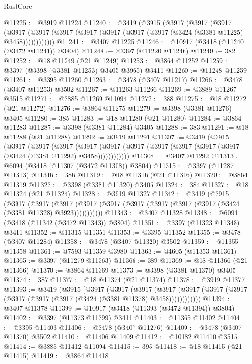\begin{lexlean}{RustCore}
\begin{coremodule}
@11225 := @3919 @11224
@11240 := @3419
    (@3915
      (@3917
        (@3917
          (@3917
            (@3917 (@3917 (@3917 (@3917 (@3917 (@3917 (@3917 (@3424 (@3381 @11225) @3458))))))))))))
@11241 := @3407 @11225
@11246 := @10917 (@3418 (@11240 (@3472 @11241)) @3804)
@11248 := @3397 (@11220 @11246)
@11249 := 382
@11252 := @18 @11249 (@21 @11249)
@11253 := @3864 @11252
@11259 := @3397 (@3398 (@3381 @11253) @3405 @3965) @3411
@11260 := @11248 @11259
@11261 := @3395 @11260
@11263 := @3478 (@3407 @11217)
@11266 := @3478 (@3407 @11253) @3502
@11267 := @11263 @11266
@11269 := @3889 @11267 @3515
@11271 := @3885 @11269 @11094
@11272 := 388
@11275 := @18 @11272 (@21 @11272)
@11276 := @3864 @11275
@11279 := @3398 (@3381 @11276) @3405
@11280 := 385
@11283 := @18 @11280 (@21 @11280)
@11284 := @3864 @11283
@11287 := @3398 (@3381 @11284) @3405
@11288 := 383
@11291 := @18 @11288 (@21 @11288)
@11292 := @3919 @11291
@11307 := @3419
    (@3915
      (@3917
        (@3917
          (@3917
            (@3917 (@3917 (@3917 (@3917 (@3917 (@3917 (@3917 (@3424 (@3381 @11292) @3458))))))))))))
@11308 := @3407 @11292
@11313 := @6094 (@3418 (@11307 (@3472 @11308)) @3804)
@11315 := @3397 (@11287 @11313)
@11316 := 386
@11319 := @18 @11316 (@21 @11316)
@11320 := @3864 @11319
@11323 := @3398 (@3381 @11320) @3405
@11324 := 384
@11327 := @18 @11324 (@21 @11324)
@11328 := @3919 @11327
@11342 := @3419
    (@3915
      (@3917
        (@3917
          (@3917 (@3917 (@3917 (@3917 (@3917 (@3917 (@3917 (@3424 (@3381 @11328) @3923)))))))))))
@11343 := @3407 @11328
@11348 := @6094 (@3418 (@11342 (@3472 @11343)) @3804)
@11351 := @3397 (@11323 @11348) @3411
@11352 := @11315 @11351
@11353 := @3395 @11352
@11355 := @3478 (@3407 @11284)
@11358 := @3478 (@3407 @11320) @3502
@11359 := @11355 @11358
@11361 := @7593 @11359 @3980
@11363 := @4605 (@11353 @11361)
@11365 := @3397 (@11279 @11363)
@11366 := 389
@11369 := @18 @11366 (@21 @11366)
@11370 := @3864 @11369
@11373 := @3398 (@3381 @11370) @3405
@11374 := 387
@11377 := @18 @11374 (@21 @11374)
@11378 := @3919 @11377
@11393 := @3419
    (@3915
      (@3917
        (@3917
          (@3917
            (@3917 (@3917 (@3917 (@3917 (@3917 (@3917 (@3917 (@3424 (@3381 @11378) @3458))))))))))))
@11394 := @3407 @11378
@11399 := @10917 (@3418 (@11393 (@3472 @11394)) @3804)
@11402 := @3397 (@11373 @11399) @3411
@11403 := @11365 @11402
@11404 := @3395 @11403
@11406 := @3478 (@3407 @11276)
@11409 := @3478 (@3407 @11370) @3502
@11410 := @11406 @11409
@11412 := @10182 @11410 @3515
@11414 := @3885 @11412 @11094
@11415 := 395
@11418 := @18 @11415 (@21 @11415)
@11419 := @3864 @11418

\end{coremodule}
\end{lexlean}
